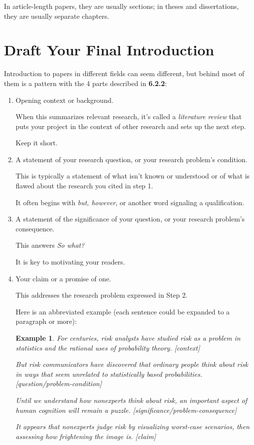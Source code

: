 \documentclass[oneside]{book}
\numberwithin{equation}{section}
\newtheorem{example}{Example}[section]
\begin{document}
In article-length papers, they are usually sections; in theses and dissertations, they are usually separate chapters.

\section{Draft Your Final Introduction}
Introduction to papers in different fields can seem different, but behind most of them is a pattern with the 4 parts described in \textbf{6.2.2}:
\begin{enumerate}
    \item Opening context or background.
    
    When this summarizes relevant research, it's called a \textit{literature review} that puts your project in the context of other research and sets up the next step.
    
    Keep it short.
    \item A statement of your research question, or your research problem's condition.
    
    This is typically a statement of what isn't known or understood or of what is flawed about the research you cited in step 1.
    
    It often begins with \textit{but, however}, or another word signaling a qualification.
    \item A statement of the significance of your question, or your research problem's consequence.
    
    This answers \textit{So what?}
    
    It is key to motivating your readers.
    \item Your claim or a promise of one.
    
    This addresses the research problem expressed in Step 2.
    
    Here is an abbreviated example (each sentence could be expanded to a paragraph or more):
    \begin{example}
        For centuries, risk analysts have studied risk as a problem in statistics and the rational uses of probability theory. \emph{[context]}
        
        But risk communicators have discovered that ordinary people think about risk in ways that seem unrelated to statistically based probabilities. \emph{[question/problem-condition]}
        
        Until we understand how nonexperts think about risk, an important aspect of human cognition will remain a puzzle. \emph{[significance/problem-consequence]}
        
        It appears that nonexperts judge risk by visualizing worst-case scenarios, then assessing how frightening the image is. \emph{[claim]}
    \end{example}
\end{enumerate}
\end{document}
